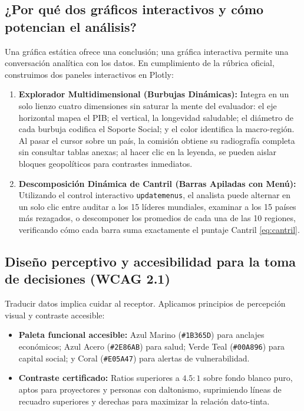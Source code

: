 \documentclass[9.5pt, a4paper]{article}
\begin{document}
\subsection{¿Por qué dos gráficos interactivos y cómo potencian el análisis?}
Una gráfica estática ofrece una conclusión; una gráfica interactiva permite una conversación analítica con los datos. En cumplimiento de la rúbrica oficial, construimos dos paneles interactivos en Plotly:
\begin{enumerate}
    \item \textbf{Explorador Multidimensional (Burbujas Dinámicas):} Integra en un solo lienzo cuatro dimensiones sin saturar la mente del evaluador: el eje horizontal mapea el PIB; el vertical, la longevidad saludable; el diámetro de cada burbuja codifica el Soporte Social; y el color identifica la macro-región. Al pasar el cursor sobre un país, la comisión obtiene su radiografía completa sin consultar tablas anexas; al hacer clic en la leyenda, se pueden aislar bloques geopolíticos para contrastes inmediatos.
    \item \textbf{Descomposición Dinámica de Cantril (Barras Apiladas con Menú):} Utilizando el control interactivo \texttt{updatemenus}, el analista puede alternar en un solo clic entre auditar a los 15 líderes mundiales, examinar a los 15 países más rezagados, o descomponer los promedios de cada una de las 10 regiones, verificando cómo cada barra suma exactamente el puntaje Cantril \eqref{eq:cantril}.
\end{enumerate}

\subsection{Diseño perceptivo y accesibilidad para la toma de decisiones (WCAG 2.1)}
Traducir datos implica cuidar al receptor. Aplicamos principios de percepción visual y contraste accesible:
\begin{itemize}
    \item \textbf{Paleta funcional accesible:} Azul Marino (\texttt{\#1B365D}) para anclajes económicos; Azul Acero (\texttt{\#2E86AB}) para salud; Verde Teal (\texttt{\#00A896}) para capital social; y Coral (\texttt{\#E05A47}) para alertas de vulnerabilidad.
    \item \textbf{Contraste certificado:} Ratios superiores a $4.5:1$ sobre fondo blanco puro, aptos para proyectores y personas con daltonismo, suprimiendo líneas de recuadro superiores y derechas para maximizar la relación dato-tinta.
\end{itemize}
\end{document}

